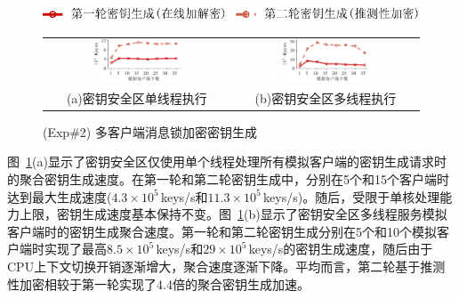 \begin{figure}[!htb]
  \small
  \centering
  \includegraphics[height=11pt]{pic/sgxdedup/plot/exp_a3/expa3_keyScale_performance_legend.pdf}
  \begin{tabular}{@{\ }c@{\ }c}
    \includegraphics[width=0.49\textwidth]{pic/sgxdedup/plot/exp_a3/expa3_keyScale_performance_number_singleThread.pdf} & 
    \hspace{5pt}
    \includegraphics[width=0.49\textwidth]{pic/sgxdedup/plot/exp_a3/expa3_keyScale_performance_number_multiThread.pdf}     \\
    \mbox{\small (a)密钥安全区单线程执行}                                                                               & 
    \mbox{\small (b)密钥安全区多线程执行}                                                                                  \\
  \end{tabular}
  \caption{(Exp\#2) 多客户端消息锁加密密钥生成}
  \label{fig:sgxdedup-exp-keygen-scalability}
\end{figure}

图~\ref{fig:sgxdedup-exp-keygen-scalability}(a)显示了密钥安全区仅使用单个线程处理所有模拟客户端的密钥生成请求时的聚合密钥生成速度。在第一轮和第二轮密钥生成中，\sysnameS 分别在5个和15个客户端时达到最大生成速度($4.3\times 10^5$\,keys/s和$11.3\times 10^5$\,keys/s)。随后，受限于单核处理能力上限，密钥生成速度基本保持不变。图~\ref{fig:sgxdedup-exp-keygen-scalability}(b)显示了密钥安全区多线程服务模拟客户端时的密钥生成聚合速度。第一轮和第二轮密钥生成分别在5个和10个模拟客户端时实现了最高$8.5\times 10^5$\,keys/s和$29\times 10^5$\,keys/s的密钥生成速度，随后由于CPU上下文切换开销逐渐增大，聚合速度逐渐下降。平均而言，第二轮基于推测性加密相较于第一轮实现了4.4倍的聚合密钥生成加速。

